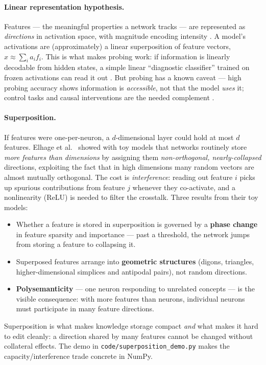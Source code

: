 \documentclass[11pt]{article}
\begin{document}
\paragraph{Linear representation hypothesis.} Features --- the meaningful properties a network tracks --- are represented as \emph{directions} in activation space, with magnitude encoding intensity \cite{elhage2021mathematical,elhage2022toy}. A model's activations are (approximately) a linear superposition of feature vectors, $x \approx \sum_i a_i f_i$. This is what makes probing work: if information is linearly decodable from hidden states, a simple linear ``diagnostic classifier'' trained on frozen activations can read it out \cite{hupkes2018visualisation,belinkov2019analysis}. But probing has a known caveat --- high probing accuracy shows information is \emph{accessible}, not that the model \emph{uses} it; control tasks and causal interventions are the needed complement \cite{belinkov2019analysis}.

\paragraph{Superposition.} If features were one-per-neuron, a $d$-dimensional layer could hold at most $d$ features. Elhage et al.\ \cite{elhage2022toy} showed with toy models that networks routinely store \emph{more features than dimensions} by assigning them \emph{non-orthogonal, nearly-collapsed} directions, exploiting the fact that in high dimensions many random vectors are almost mutually orthogonal. The cost is \emph{interference}: reading out feature $i$ picks up spurious contributions from feature $j$ whenever they co-activate, and a nonlinearity (ReLU) is needed to filter the crosstalk. Three results from their toy models:
\begin{itemize}[noitemsep]
  \item Whether a feature is stored in superposition is governed by a \textbf{phase change} in feature sparsity and importance --- past a threshold, the network jumps from storing a feature to collapsing it.
  \item Superposed features arrange into \textbf{geometric structures} (digons, triangles, higher-dimensional simplices and antipodal pairs), not random directions.
  \item \textbf{Polysemanticity} --- one neuron responding to unrelated concepts --- is the visible consequence: with more features than neurons, individual neurons must participate in many feature directions.
\end{itemize}
Superposition is what makes knowledge storage compact \emph{and} what makes it hard to edit cleanly: a direction shared by many features cannot be changed without collateral effects. The demo in \texttt{code/superposition\_demo.py} makes the capacity/interference trade concrete in NumPy.
\end{document}
